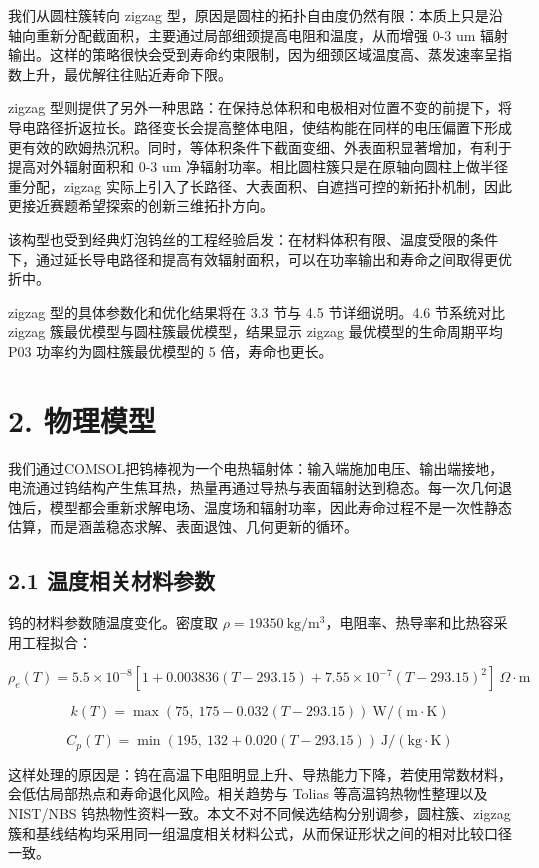\documentclass[
  a4paper,
]{ctexart}
\begin{document}
我们从圆柱簇转向 zigzag
型，原因是圆柱的拓扑自由度仍然有限：本质上只是沿轴向重新分配截面积，主要通过局部细颈提高电阻和温度，从而增强
0-3 um
辐射输出。这样的策略很快会受到寿命约束限制，因为细颈区域温度高、蒸发速率呈指数上升，最优解往往贴近寿命下限。

zigzag
型则提供了另外一种思路：在保持总体积和电极相对位置不变的前提下，将导电路径折返拉长。路径变长会提高整体电阻，使结构能在同样的电压偏置下形成更有效的欧姆热沉积。同时，等体积条件下截面变细、外表面积显著增加，有利于提高对外辐射面积和
0-3 um 净辐射功率。相比圆柱簇只是在原轴向圆柱上做半径重分配，zigzag
实际上引入了长路径、大表面积、自遮挡可控的新拓扑机制，因此更接近赛题希望探索的创新三维拓扑方向。

该构型也受到经典灯泡钨丝的工程经验启发：在材料体积有限、温度受限的条件下，通过延长导电路径和提高有效辐射面积，可以在功率输出和寿命之间取得更优折中。

zigzag 型的具体参数化和优化结果将在 3.3 节与 4.5 节详细说明。4.6
节系统对比 zigzag 簇最优模型与圆柱簇最优模型，结果显示 zigzag
最优模型的生命周期平均 P03 功率约为圆柱簇最优模型的 5 倍，寿命也更长。

\section{2. 物理模型}\label{ux7269ux7406ux6a21ux578b}

我们通过COMSOL把钨棒视为一个电热辐射体：输入端施加电压、输出端接地，电流通过钨结构产生焦耳热，热量再通过导热与表面辐射达到稳态。每一次几何退蚀后，模型都会重新求解电场、温度场和辐射功率，因此寿命过程不是一次性静态估算，而是涵盖稳态求解、表面退蚀、几何更新的循环。

\subsection{2.1
温度相关材料参数}\label{ux6e29ux5ea6ux76f8ux5173ux6750ux6599ux53c2ux6570}

钨的材料参数随温度变化。密度取
\(\rho=19350\ \mathrm{kg/m^3}\)，电阻率、热导率和比热容采用工程拟合：

\[
\rho_e(T)=5.5\times10^{-8}\left[1+0.003836(T-293.15)+7.55\times10^{-7}(T-293.15)^2\right]\ \Omega\cdot\mathrm m
\]

\[
k(T)=\max\left(75,\ 175-0.032(T-293.15)\right)\ \mathrm{W/(m\cdot K)}
\]

\[
C_p(T)=\min\left(195,\ 132+0.020(T-293.15)\right)\ \mathrm{J/(kg\cdot K)}
\]

这样处理的原因是：钨在高温下电阻明显上升、导热能力下降，若使用常数材料，会低估局部热点和寿命退化风险。相关趋势与
Tolias 等高温钨热物性整理以及 NIST/NBS 钨热物性资料一致。本文不对不同候选结构分别调参，圆柱簇、zigzag 簇和基线结构均采用同一组温度相关材料公式，从而保证形状之间的相对比较口径一致。
\end{document}
